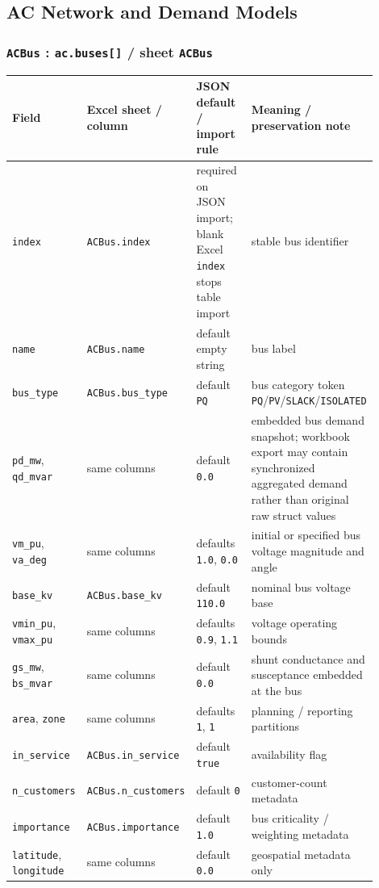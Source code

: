 \subsection{AC Network and Demand Models}

\subsubsection*{\texttt{ACBus} : \texttt{ac.buses[]} / sheet \texttt{ACBus}}

\begin{longtable}{L{0.20\linewidth}L{0.24\linewidth}L{0.20\linewidth}L{0.26\linewidth}}
\toprule
Field & Excel sheet / column & JSON default / import rule & Meaning / preservation note \\
\midrule
\endhead
\texttt{index} & \texttt{ACBus.index} & required on JSON import; blank Excel \texttt{index} stops table import & stable bus identifier \\
\texttt{name} & \texttt{ACBus.name} & default empty string & bus label \\
\texttt{bus\_type} & \texttt{ACBus.bus\_type} & default \texttt{PQ} & bus category token \texttt{PQ}/\texttt{PV}/\texttt{SLACK}/\texttt{ISOLATED} \\
\texttt{pd\_mw}, \texttt{qd\_mvar} & same columns & default \texttt{0.0} & embedded bus demand snapshot; workbook export may contain synchronized aggregated demand rather than original raw struct values \\
\texttt{vm\_pu}, \texttt{va\_deg} & same columns & defaults \texttt{1.0}, \texttt{0.0} & initial or specified bus voltage magnitude and angle \\
\texttt{base\_kv} & \texttt{ACBus.base\_kv} & default \texttt{110.0} & nominal bus voltage base \\
\texttt{vmin\_pu}, \texttt{vmax\_pu} & same columns & defaults \texttt{0.9}, \texttt{1.1} & voltage operating bounds \\
\texttt{gs\_mw}, \texttt{bs\_mvar} & same columns & default \texttt{0.0} & shunt conductance and susceptance embedded at the bus \\
\texttt{area}, \texttt{zone} & same columns & defaults \texttt{1}, \texttt{1} & planning / reporting partitions \\
\texttt{in\_service} & \texttt{ACBus.in\_service} & default \texttt{true} & availability flag \\
\texttt{n\_customers} & \texttt{ACBus.n\_customers} & default \texttt{0} & customer-count metadata \\
\texttt{importance} & \texttt{ACBus.importance} & default \texttt{1.0} & bus criticality / weighting metadata \\
\texttt{latitude}, \texttt{longitude} & same columns & default \texttt{0.0} & geospatial metadata only \\
\bottomrule
\end{longtable}

